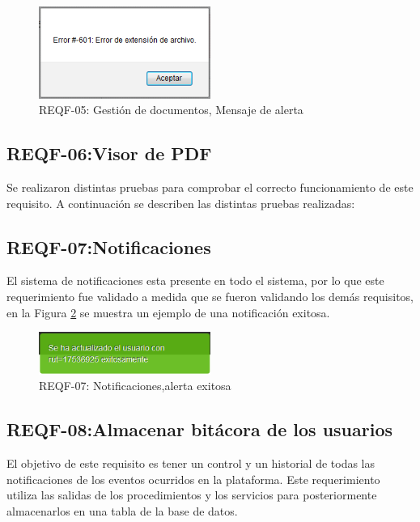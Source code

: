 \begin{figure}[H]
	\centering
	\includegraphics[width=0.5\textwidth]{images/Capitulo_5/REQF-05.png}
	\caption[REQF-05: Gestión de documentos, Mensaje de alerta ]{REQF-05: Gestión de documentos, Mensaje de alerta }
	\label{REQF-05}
\end{figure}
\subsection{REQF-06:Visor de PDF}

Se realizaron distintas pruebas para comprobar el correcto funcionamiento de este requisito. A continuación se describen las distintas pruebas realizadas:

\subsection{REQF-07:Notificaciones}


El sistema de notificaciones esta presente en todo el sistema, por lo que este requerimiento  fue validado a medida que se fueron validando los demás  requisitos, en la Figura \ref{REQF-07} se muestra un ejemplo de una notificación exitosa.
 
\begin{figure}[H]
	\centering
	\includegraphics[width=0.5\textwidth]{images/Capitulo_5/REQF-07.png}
	\caption[REQF-07: Notificaciones, alerta exitosa ]{REQF-07: Notificaciones,alerta exitosa }
	\label{REQF-07}
\end{figure}



\subsection{REQF-08:Almacenar bitácora de los usuarios}


El objetivo de este requisito es tener un control y un historial de todas las notificaciones de los eventos ocurridos en la plataforma.
Este requerimiento utiliza las salidas de los procedimientos y los servicios para posteriormente almacenarlos en una tabla de la base de datos.


